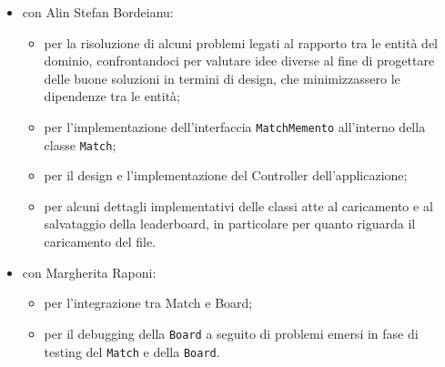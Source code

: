 \documentclass[a4paper,12pt]{report}
\begin{document}
\begin{itemize}
	\item con Alin Stefan Bordeianu:
		\begin{itemize}
			\item per la risoluzione di alcuni problemi legati al rapporto tra le entità del dominio,
confrontandoci per valutare idee diverse al fine di progettare delle buone soluzioni in termini di design, che minimizzassero le dipendenze tra le entità;
			\item per l'implementazione dell'interfaccia \texttt{MatchMemento} all'interno della classe \texttt{Match};
			\item per il design e l'implementazione del Controller dell'applicazione;
			\item per alcuni dettagli implementativi delle classi atte al caricamento e al salvataggio della leaderboard, in particolare per quanto riguarda il caricamento del file.
		\end{itemize}
	\item con Margherita Raponi:
		\begin{itemize}
			\item per l'integrazione tra Match e Board;
			\item per il debugging della \texttt{Board} a seguito di problemi emersi in fase di testing del \texttt{Match} e della \texttt{Board}.
		\end{itemize}
\end{itemize}
\end{document}
